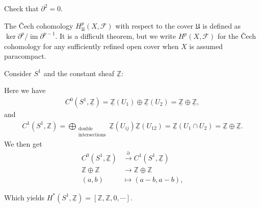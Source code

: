 \begin{exercise}[?]

Check that \({{\partial}}^2 = 0\).

\end{exercise}

\begin{remark}

The Čech cohomology \(H^p_{\mathfrak{U}}(X, \mathcal{F})\) with respect
to the cover \(\mathfrak{U}\) is defined as
\(\ker {{\partial}}^p/\operatorname{im}{{\partial}}^{p-1}\). It is a
difficult theorem, but we write \(H^p(X, \mathcal{F})\) for the Čech
cohomology for any sufficiently refined open cover when \(X\) is assumed
paracompact.

\end{remark}

\begin{example}[?]

Consider \(S^1\) and the constant sheaf \(\underline{{\mathbb{Z}}}\):

\begin{figure}
\centering
{}
\end{figure}

Here we have
\begin{align*}
C^0(S^1, \underline{{\mathbb{Z}}}) = \underline{{\mathbb{Z}}}(U_1) \oplus \underline{{\mathbb{Z}}}(U_2) = \underline{{\mathbb{Z}}} \oplus \underline{{\mathbb{Z}}}
,\end{align*}
and
\begin{align*}
C^1(S^1, {\mathbb{Z}}) = \bigoplus_{\substack{ \text{double} \\ \text{intersections}} } \underline{{\mathbb{Z}}}(U_{ij})  \underline{{\mathbb{Z}}}(U_{12}) = \underline{{\mathbb{Z}}}(U_1 \cap U_{2}) = \underline{{\mathbb{Z}}} \oplus \underline{{\mathbb{Z}}}
.\end{align*}
We then get
\begin{align*}
C^0(S^1, \underline{{\mathbb{Z}}}) &\xrightarrow{{{\partial}}} C^1(S^1, \underline{{\mathbb{Z}}}) \\
{\mathbb{Z}}\oplus {\mathbb{Z}}&\to {\mathbb{Z}}\oplus {\mathbb{Z}}\\
(a, b) &\mapsto (a-b, a-b)
,\end{align*}

Which yields
\(H^*(S^1, \underline{{\mathbb{Z}}}) = [{\mathbb{Z}}, {\mathbb{Z}}, 0, \cdots]\).

\end{example}

